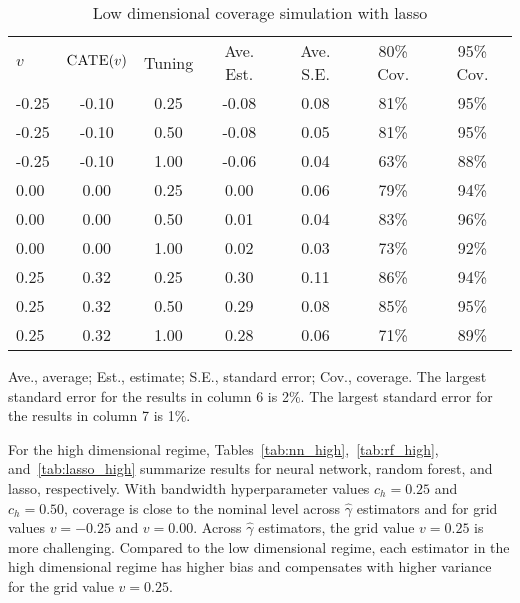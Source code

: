 \begin{table}[H]
\centering
  \begin{threeparttable}
    \caption{Low dimensional coverage simulation with lasso}
     \begin{tabular}{lcccccc}
       $v$& $\textsc{CATE}(v)$ & Tuning &  Ave. Est. & Ave. S.E. &  80\% Cov. & 95\% Cov. \\[5pt]
-0.25 & -0.10 & 0.25 & -0.08 & 0.08 &  81\% & 95\% \\
-0.25 & -0.10 & 0.50 & -0.08 & 0.05  & 81\% & 95\% \\
-0.25 & -0.10 & 1.00 & -0.06 & 0.04  & 63\% & 88\% \\
0.00 & 0.00 & 0.25 & 0.00 & 0.06 &  79\% & 94\% \\
0.00 & 0.00 & 0.50 & 0.01 & 0.04  & 83\% & 96\% \\
0.00 & 0.00 & 1.00 & 0.02 & 0.03  & 73\% & 92\% \\
0.25 & 0.32 & 0.25 & 0.30 & 0.11 &  86\% & 94\% \\
0.25 & 0.32 & 0.50 & 0.29 & 0.08  & 85\% & 95\% \\
0.25 & 0.32 & 1.00 & 0.28 & 0.06  & 71\% & 89\% 
     \end{tabular}
     \label{tab:lasso_low}
    \begin{tablenotes}
      \small
      \item Ave., average; Est., estimate; S.E., standard error; Cov., coverage. The largest standard error for the results in column 6 is 2\%. The largest standard error for the results in column 7 is 1\%.
    \end{tablenotes}
  \end{threeparttable}
\end{table}

For the high dimensional regime, Tables~\ref{tab:nn_high},~\ref{tab:rf_high}, and~\ref{tab:lasso_high} summarize results for neural network, random forest, and lasso, respectively. With bandwidth hyperparameter values $c_h=0.25$ and $c_h=0.50$, coverage is close to the nominal level across $\hat{\gamma}$ estimators and for grid values $v=-0.25$ and $v=0.00$. Across $\hat{\gamma}$ estimators, the grid value $v=0.25$ is more challenging. Compared to the low dimensional regime, each estimator in the high dimensional regime has higher bias and compensates with higher variance for the grid value $v=0.25$.



